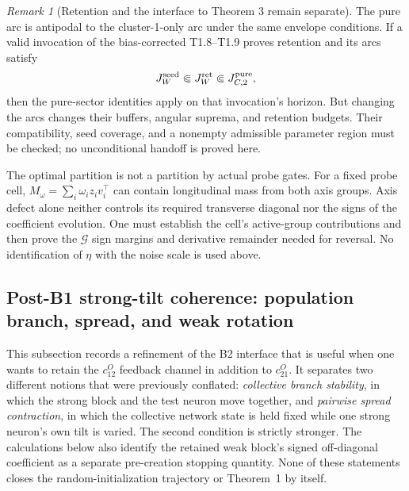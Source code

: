 \documentclass{article} %
\theoremstyle{plain}
\theoremstyle{definition}
\theoremstyle{remark}
\newtheorem{remark}[theorem]{Remark}
\begin{document}
\begin{remark}[Retention and the interface to Theorem 3 remain separate]
The pure arc is antipodal to the cluster-1-only arc under the same envelope
conditions. If a valid invocation of the bias-corrected T1.8--T1.9 proves
retention and its arcs satisfy
\[
 J_W^{\rm seed}\Subset J_W^{\rm ret}\Subset J_{C,2}^{\rm pure},
\]
then the pure-sector identities apply on that invocation's horizon.
But changing the arcs changes their buffers, angular suprema, and retention
budgets. Their compatibility, seed coverage, and a nonempty admissible
parameter region must be checked; no unconditional handoff is proved here.

The optimal partition is not a partition by actual probe gates. For a fixed
probe cell, $M_\omega=\sum_i\omega_i z_iv_i^\top$ can contain longitudinal
mass from both axis groups. Axis defect alone neither controls its required
transverse diagonal nor the signs of the coefficient evolution. One must
establish the cell's active-group contributions and then prove the
$\mathcal G$ sign margins and derivative remainder needed for reversal.
No identification of $\eta$ with the noise scale is used above.
\end{remark}


\subsection{Post-B1 strong-tilt coherence: population branch, spread, and weak rotation}
\label{sbcoh:scope}

This subsection records a refinement of the B2 interface that is useful when
one wants to retain the $c_{12}^O$ feedback channel in addition to $c_{21}^O$.
It separates two different notions that were previously conflated:
\emph{collective branch stability}, in which the strong block and the test
neuron move together, and \emph{pairwise spread contraction}, in which the
collective network state is held fixed while one strong neuron's own tilt is
varied.  The second condition is strictly stronger.  The calculations below
also identify the retained weak block's signed off-diagonal coefficient as a
separate pre-creation stopping quantity.  None of these statements closes the
random-initialization trajectory or Theorem~1 by itself.
\end{document}
